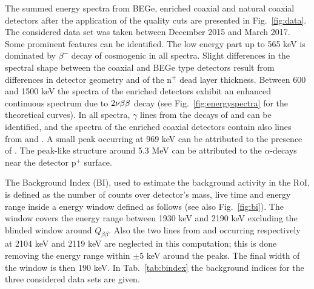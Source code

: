 The summed energy spectra from BEGe, enriched coaxial and natural coaxial detectors after the application of the quality cuts are presented in Fig.~\ref{fig:data}. The considered data set was taken between December 2015 and March 2017. Some prominent features can be identified. The low energy part up to 565 keV is dominated by $\beta^-$ decay of cosmogenic  in all spectra. Slight differences in the spectral shape between the coaxial and BEGe type detectors result from differences in detector geometry and of the n$^+$ dead layer thickness. Between 600 and 1500 keV the spectra of the enriched detectors exhibit an enhanced continuous spectrum due to $2\nu\beta\beta$ decay (see Fig.~\ref{fig:energyspectra} for the theoretical curves). In all spectra, $\gamma$ lines from the decays of  and  can be identified, and the spectra of the enriched coaxial detectors contain also lines from  and . A small peak occurring at 969 keV can be attributed to the presence of . The peak-like structure around 5.3 MeV can be attributed to the $\alpha$-decays near the detector p$^+$ surface.

 The Background Index (BI), used to estimate the background activity in the \textsc{RoI}, is defined as the number of counts over detector's mass, live time and energy range inside a energy window defined as follows (see also Fig.~\ref{fig:bi}). The window covers the energy range between 1930 keV and 2190 keV excluding the blinded window around $Q_{\beta\beta}$. Also the two lines from  and  occurring respectively at 2104 keV and 2119 keV are neglected in this computation; this is done removing the energy range within $\pm$5 keV around the peaks. The final width of the window is then 190 keV. In Tab.~\ref{tab:bindex} the background indices for the three considered data sets are given.


